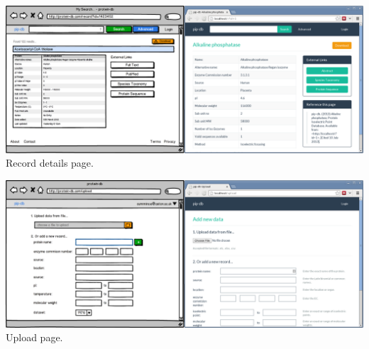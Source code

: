 \begin{center}
\br{}

\noindent\includegraphics[width=\textwidth]{assets/m1-comparison-details}
Record details page.

\br{}

\noindent\includegraphics[width=\textwidth]{assets/m1-comparison-upload}
Upload page.

\end{center}
